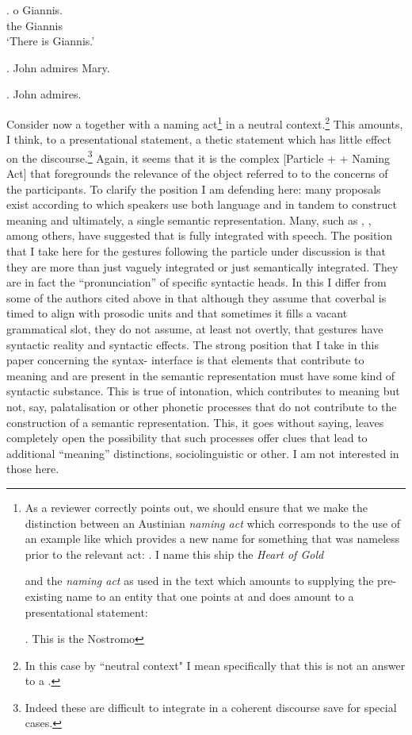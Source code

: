 \documentclass[output=paper]{LSP/langsci}
\begin{document}
\exg. 
\na o Giannis.\\
\na the Giannis\\  \label{p2}
\glt `There is Giannis.'

\Lsciex. \label{ad1}
John admires Mary.

\Lsciex. \label{ad2}
John admires.


Consider now a  together with a naming act\footnote{As a reviewer correctly points out, we should ensure that we make the distinction between an Austinian \textit{naming act} \citep{austin-jl:1962b} which corresponds to the use of an example like \Next which provides a new name for something that was nameless prior to the relevant act:
  \Lsciex.
  I name this ship the \textit{Heart of Gold}


  and the \textit{naming act} as used in the text which amounts to supplying the pre-existing name to an entity that one points at and does amount to a presentational statement:

  \Lsciex.
  This is the Nostromo

} 
in a neutral context.\footnote{In this case by ``neutral context" I mean specifically that this is not an answer to a .} This amounts, I think, to a presentational statement, a thetic statement which has little effect on the discourse.\footnote{Indeed these are difficult to integrate in a coherent discourse save for special cases.} Again, it seems that it is the complex [Particle +  + Naming Act] that foregrounds the relevance of the object referred to  to the concerns of the participants. 
To clarify the position I am defending here:  many proposals exist according to which speakers use both language and  in tandem to construct meaning and ultimately, a single semantic representation.  
Many, such as \citet{mcneil:05}, \citet{lascarides-stone:09}, \citet{kopp-et-al:04} among others, have suggested that  is fully integrated with speech.  The position that I take here for the gestures following the particle under discussion is that they are more than just vaguely integrated or just semantically integrated.  
They are in fact the ``pronunciation'' of specific syntactic heads.  In this I differ from some of the authors cited above in that although they assume that coverbal   is timed to align with prosodic units and that sometimes it fills a vacant grammatical slot, they do not assume, at least not overtly, that gestures have syntactic reality and syntactic effects.  The strong position that I take in this paper concerning the syntax- interface is that elements that contribute to meaning  and are present in the semantic representation must have some kind of syntactic substance.  This is true of intonation, which contributes to meaning but not, say, palatalisation or other phonetic processes that do not contribute to the construction of a semantic representation.  This, it goes without saying, leaves completely open the possibility that such processes offer  clues that lead to additional ``meaning'' distinctions, sociolinguistic or other. I am not interested in those here.  
\end{document}
